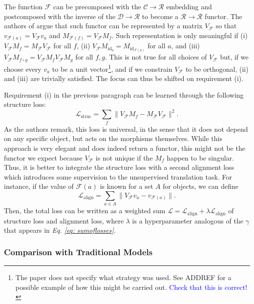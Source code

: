 \documentclass[11pt,a4paper,openright,twoside]{report}
\theoremstyle{plain}
\theoremstyle{definition}
\begin{document}
The function $\mathcal{F}$ can be precomposed with the $\mathcal{C} \to \mathcal{R}$ embedding and postcomposed with the inverse of the $\mathcal{D} \to \mathcal{R}$ to become a $\mathcal{R} \to \mathcal{R}$ functor. The authors of \cite{sheshmaniCategoricalRepresentationLearning2022} argue that such functor can be represented by a matrix $V_\mathcal{F}$ so that $v_{\mathcal{F}(a)} =  V_\mathcal{F}v_a$ and $M_{\mathcal{F}(f)} = V_\mathcal{F}M_f$. Such representation is only meaningful if (i) $V_{\mathcal{F}}M_f = M_{\mathcal{F}}V_{\mathcal{F}}$ for all $f$, (ii) $V_{\mathcal{F}}M_{\mathrm{id}_a} = M_{\mathrm{id}_{\mathcal{F}(a)}}$ for all $a$, and (iii) $V_{\mathcal{F}}M_{f \circ g} = V_{\mathcal{F}}M_fV_{\mathcal{F}}M_g$ for all $f,g$. This is not true for all choices of  $V_\mathcal{F}$ but, if we choose every $v_a$ to be a unit vector\footnote{The paper does not specify what strategy was used. See ADDREF for a possible example of how this might be carried out. \textcolor{blue}{Check that this is correct!}}, and if we constrain $V_{\mathcal{F}}$ to be orthogonal, (ii) and (iii) are trivially satisfied. The focus can thus be shifted on requirement (i).


Requirement (i) in the previous paragraph can be learned through the following structure loss:
\[\mathcal{L}_{\mathrm{struc}} = \sum_{f}\|V_{\mathcal{F}}M_f - M_{\mathcal{F}}V_{\mathcal{F}}\|^2.\]
As the authors remark, this loss is universal, in the sense that it does not depend on any specific object, but acts on the morphisms themselves. While this approach is very elegant and does indeed return a functor, this might not be the functor we expect because $V_{\mathcal{F}}$ is not unique if the $M_f$ happen to be singular. Thus, it is better to integrate the structure loss with a second alignment loss which introduces some supervision to the unsupervised translation task. For instance, if the value of $\mathcal{F}(a)$ is known for a set $A$ for objects, we can define
\[\mathcal{L}_{\mathrm{align}} = \sum_{a \in A}\|V_{\mathcal{F}}v_a - v_{\mathcal{F}(a)}\|.\]
Then, the total loss can be written as a weighted sum $\mathcal{L} = \mathcal{L}_{\mathrm{align}} + \lambda \mathcal{L}_{\mathrm{align}}$ of structure loss and alignment loss, where $\lambda$ is a hyperparameter analogous of the $\gamma$ that appears in \textit{Eq. \ref{eq: sumoflosses}}.


\subsubsection{Comparison with Traditional Models}
\end{document}
